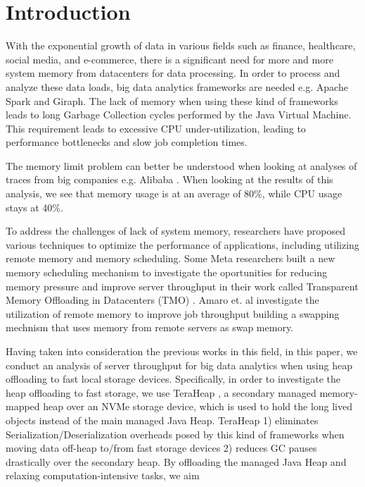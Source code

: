 \section{Introduction}
\label{sec:intro}

With the exponential growth of data in various fields such as finance,
healthcare, social media, and e-commerce, there is a significant need
for more and more system memory from datacenters for data processing. In order
to process and analyze these data loads, big data analytics frameworks
are needed e.g. Apache Spark \cite{Spark} and Giraph. 
The lack of memory when using these kind of frameworks leads to
long Garbage Collection cycles performed by the Java Virtual Machine.
This requirement leads to excessive CPU under-utilization, 
leading to performance bottlenecks and slow job completion
times.
\par The memory limit problem can better be understood when looking at analyses of traces from big companies e.g. Alibaba \cite{Alibaba}.
When looking at the results of this analysis, we see that memory usage is at an average of 80\%, while CPU usage stays at 40\%. 
\par To address the challenges of lack of system memory, researchers have proposed various
techniques to optimize the performance of applications, including
utilizing remote memory and memory scheduling.
Some Meta researchers built a new memory scheduling mechanism to investigate the oportunities
for reducing memory pressure and improve server throughput in their work called Transparent Memory Offloading in Datacenters (TMO)
\cite{TMO}. Amaro et. al investigate the utilization of remote memory to improve job throughput \cite{CFM} building a swapping mechnism that uses memory from remote servers as swap memory.
\par Having taken into consideration the previous works in this field,
in this paper, we conduct an analysis of server throughput for big data analytics when using heap offloading to fast local storage devices.
Specifically, in order to investigate the heap offloading to fast storage,
we use TeraHeap \cite{TeraHeap}, a secondary managed
memory-mapped heap over an NVMe storage device, which is used to hold
the long lived objects instead of the main
managed Java Heap.
TeraHeap 1) eliminates Serialization/Deserialization overheads posed
by this kind of frameworks when moving data off-heap to/from fast
storage devices 2) reduces GC pauses drastically over the secondary heap.
By offloading the managed Java Heap and relaxing computation-intensive tasks, we aim
